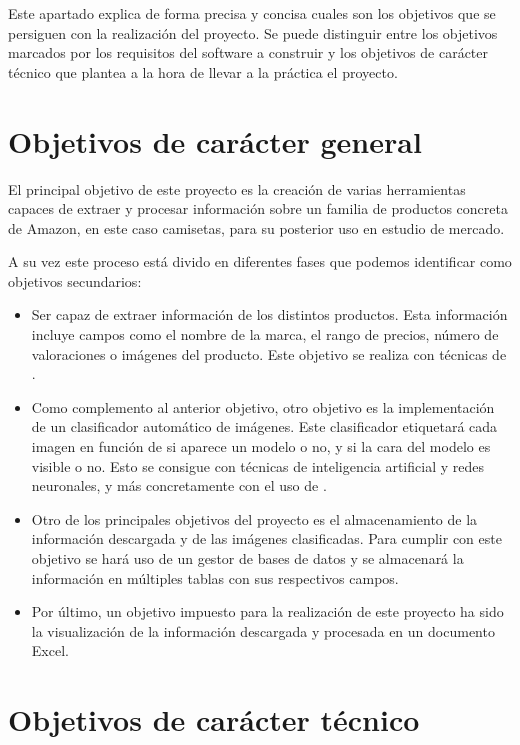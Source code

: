 
Este apartado explica de forma precisa y concisa cuales son los objetivos que se persiguen con la realización del proyecto. Se puede distinguir entre los objetivos marcados por los requisitos del software a construir y los objetivos de carácter técnico que plantea a la hora de llevar a la práctica el proyecto.

\section{Objetivos de carácter general}

El principal objetivo de este proyecto es la creación de varias herramientas capaces de extraer y procesar información sobre un familia de productos concreta de Amazon, en este caso camisetas, para su posterior uso en estudio de mercado.

A su vez este proceso está divido en diferentes fases que podemos identificar como objetivos secundarios:

\begin{itemize}
	\item Ser capaz de extraer información de los distintos productos. Esta información incluye campos como el nombre de la marca, el rango de precios, número de valoraciones o imágenes del producto. Este objetivo se realiza con técnicas de .
	\item Como complemento al anterior objetivo, otro objetivo es la implementación de un clasificador automático de imágenes. Este clasificador etiquetará cada imagen en función de si aparece un modelo o no, y si la cara del modelo es visible o no. Esto se consigue con técnicas de inteligencia artificial y redes neuronales, y más concretamente con el uso de .
	\item Otro de los principales objetivos del proyecto es el almacenamiento de la información descargada y de las imágenes clasificadas. Para cumplir con este objetivo se hará uso de un gestor de bases de datos y se almacenará la información en múltiples tablas con sus respectivos campos.
	\item Por último, un objetivo impuesto para la realización de este proyecto ha sido la visualización de la información descargada y procesada en un documento Excel.
\end{itemize}

\section{Objetivos de carácter técnico}

